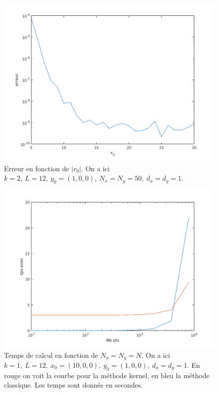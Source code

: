 \documentclass[11pt]{article}
\begin{document}
\begin{figure}
  \centering
  \includegraphics[height=.35\textheight]{err_x0}
  \caption{Erreur en fonction de $|r_0|$. On a ici $k=2,~L=12,~y_0=(1,0,0),~ N_x = N_y = 50, ~d_x=d_y=1.$}
  \label{fig:err_x0}
\end{figure}

\begin{figure}
  \centering
  \includegraphics[height=.35\textheight]{tps_npts}
  \caption{Temps de calcul en fonction de $N_x = N_y = N$. On a ici $k=1,~L=12,~x_0=(10,0,0),~y_0=(1,0,0), ~d_x=d_y=1$. En rouge on voit la
    courbe pour la méthode kernel, en bleu la méthode classique. Les temps sont donnés en secondes.}
  \label{fig:tps_npts}
\end{figure}
\end{document}
